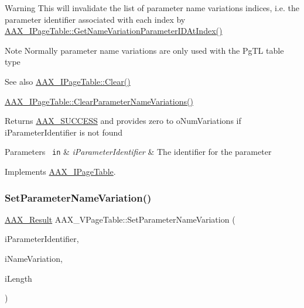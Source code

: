 \begin{DoxyWarning}{Warning}
This will invalidate the list of parameter name variations indices, i.\+e. the parameter identifier associated with each index by \mbox{\hyperlink{a01849_ac505024dd195c1965c54acac8f1f3016}{A\+A\+X\+\_\+\+I\+Page\+Table\+::\+Get\+Name\+Variation\+Parameter\+I\+D\+At\+Index()}}
\end{DoxyWarning}
\begin{DoxyNote}{Note}
Normally parameter name variations are only used with the {\ttfamily \textquotesingle{}Pg\+TL\textquotesingle{}} table type
\end{DoxyNote}
\begin{DoxySeeAlso}{See also}
\mbox{\hyperlink{a01849_a00a902ce17c43ae32947dba6088936d2}{A\+A\+X\+\_\+\+I\+Page\+Table\+::\+Clear()}} 

\mbox{\hyperlink{a01849_a6af3965eaf2baeadef9a44aa9c77ecbb}{A\+A\+X\+\_\+\+I\+Page\+Table\+::\+Clear\+Parameter\+Name\+Variations()}}
\end{DoxySeeAlso}
\begin{DoxyReturn}{Returns}
\mbox{\hyperlink{a00494_a5f8c7439f3a706c4f8315a9609811937aeddbd1bb67e3a66e6af54a4b4a7a57b3}{A\+A\+X\+\_\+\+S\+U\+C\+C\+E\+SS}} and provides zero to {\ttfamily o\+Num\+Variations} if {\ttfamily i\+Parameter\+Identifier} is not found
\end{DoxyReturn}

\begin{DoxyParams}[1]{Parameters}
\mbox{\texttt{ in}}  & {\em i\+Parameter\+Identifier} & The identifier for the parameter \\
\hline
\end{DoxyParams}


Implements \mbox{\hyperlink{a01849_ae6cf05c366d982e8ea92fea1d98f1d22}{A\+A\+X\+\_\+\+I\+Page\+Table}}.

\mbox{\label{a01929_a69806d8b27f2c91a5d2d9fbe45accc79}} 
\subsubsection{\texorpdfstring{SetParameterNameVariation()}{SetParameterNameVariation()}}
{\footnotesize\ttfamily \mbox{\hyperlink{a00392_a4d8f69a697df7f70c3a8e9b8ee130d2f}{A\+A\+X\+\_\+\+Result}} A\+A\+X\+\_\+\+V\+Page\+Table\+::\+Set\+Parameter\+Name\+Variation (\begin{DoxyParamCaption}\item[{\mbox{\hyperlink{a00392_ab4e01b971dac1b25632fd9f710dd8f77}{A\+A\+X\+\_\+\+C\+Page\+Table\+Param\+ID}}}]{i\+Parameter\+Identifier,  }\item[{const \mbox{\hyperlink{a01873}{A\+A\+X\+\_\+\+I\+String}} \&}]{i\+Name\+Variation,  }\item[{int32\+\_\+t}]{i\+Length }\end{DoxyParamCaption})\hspace{0.3cm}{\ttfamily [virtual]}}






